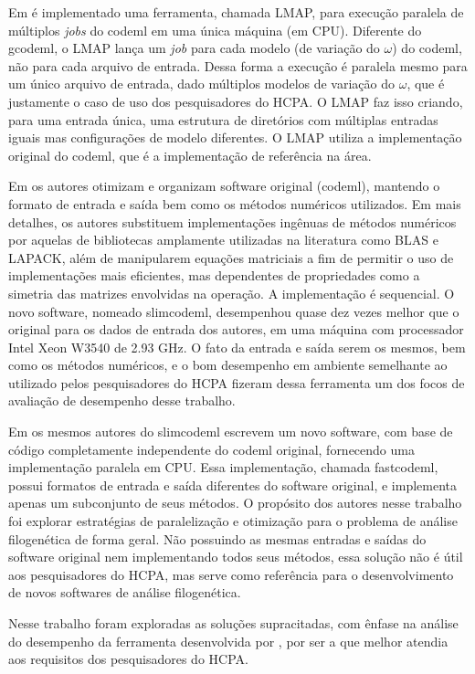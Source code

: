 \documentclass[cic,tc]{iiufrgs}
\begin{document}
Em \cite{maldonado2016lmap} é implementado uma
ferramenta, chamada LMAP, para execução paralela de múltiplos \textit{jobs} do
codeml em uma única máquina (em CPU). Diferente do gcodeml, o LMAP lança um
\textit{job} para cada modelo (de variação do $\omega$) do codeml, não para
cada arquivo de entrada. Dessa forma a execução é paralela mesmo para um único
arquivo de entrada, dado múltiplos modelos de variação do $\omega$, que é
justamente o caso de uso dos pesquisadores do HCPA. O LMAP faz isso criando,
para uma entrada única, uma estrutura de diretórios com múltiplas entradas
iguais mas configurações de modelo diferentes. O LMAP utiliza a implementação
original do codeml, que é a implementação de referência na área.

Em \cite{schabauer2012slimcodeml} os autores otimizam e organizam software
original (codeml), mantendo o formato de entrada e saída bem como os métodos
numéricos utilizados. Em mais detalhes, os autores substituem implementações
ingênuas de métodos numéricos por aquelas de bibliotecas amplamente utilizadas
na literatura como BLAS e LAPACK, além de manipularem equações matriciais a fim
de permitir o uso de implementações mais eficientes, mas dependentes de
propriedades como a simetria das matrizes envolvidas na operação. A
implementação é sequencial. O novo software, nomeado slimcodeml, desempenhou
quase dez vezes melhor que o original para os dados de entrada dos autores, em
uma máquina com processador Intel Xeon W3540 de 2.93 GHz. O fato da entrada e
saída serem os mesmos, bem como os métodos numéricos, e o bom desempenho em
ambiente semelhante ao utilizado pelos pesquisadores do HCPA fizeram dessa
ferramenta um dos focos de avaliação de desempenho desse trabalho.

Em \cite{valle2014optimization} os mesmos autores do slimcodeml escrevem um
novo software, com base de código completamente independente do codeml
original, fornecendo uma implementação paralela em CPU. Essa implementação,
chamada fastcodeml, possui formatos de entrada e saída diferentes do software
original, e implementa apenas um subconjunto de seus métodos. O propósito dos
autores nesse trabalho foi explorar estratégias de paralelização e otimização
para o problema de análise filogenética de forma geral. Não possuindo as mesmas
entradas e saídas do software original nem implementando todos seus métodos,
essa solução não é útil aos pesquisadores do HCPA, mas serve como referência
para o desenvolvimento de novos softwares de análise filogenética.

Nesse trabalho foram exploradas as soluções supracitadas, com ênfase na análise
do desempenho da ferramenta desenvolvida por \cite{schabauer2012slimcodeml},
por ser a que melhor atendia aos requisitos dos pesquisadores do HCPA.
\end{document}
